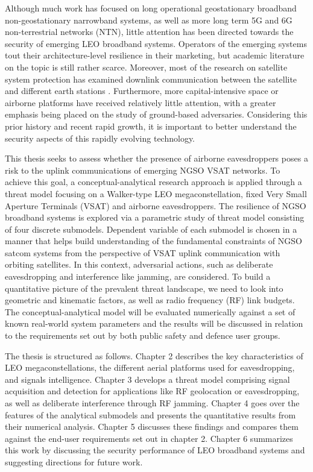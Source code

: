 \documentclass[english, 12pt, a4paper, elec, utf8, a-1b, online]{aaltothesis}
\begin{document}
Although much work has focused on long operational geostationary broadband non-geostationary narrowband systems, as well as more long term 5G and 6G non-terrestrial networks (NTN), little attention has been directed towards the security of emerging LEO broadband systems.
Operators of the emerging systems tout their architecture-level resilience in their marketing, but academic literature on the topic is still rather scarce.
Moreover, most of the research on satellite system protection has examined downlink communication between the satellite and different earth stations \cite{abdelsalam2023physical}.
Furthermore, more capital-intensive space or airborne platforms have received relatively little attention, with a greater emphasis being placed on the study of ground-based adversaries.
Considering this prior history and recent rapid growth, it is important to better understand the security aspects of this rapidly evolving technology. 

This thesis seeks to assess whether the presence of airborne eavesdroppers poses a risk to the uplink communications of emerging NGSO VSAT networks. %
To achieve this goal, a conceptual-analytical research approach is applied through a threat model focusing on a Walker-type LEO megaconstellation, fixed Very Small Aperture Terminals (VSAT) and airborne eavesdroppers.
The resilience of NGSO broadband systems is explored via a parametric study of threat model consisting of four discrete submodels.
Dependent variable of each submodel is chosen in a manner that helps build understanding of the fundamental constraints of NGSO satcom systems from the perspective of VSAT uplink communication with orbiting satellites.
In this context, adversarial actions, such as deliberate eavesdropping and interference like jamming, are considered.
To build a quantitative picture of the prevalent threat landscape, we need to look into geometric and kinematic factors, as well as radio frequency (RF) link budgets. 
The conceptual-analytical model will be evaluated numerically against a set of known real-world system parameters and the results will be discussed in relation to the requirements set out by both public safety and defence user groups.

The thesis is structured as follows.
Chapter 2 describes the key characteristics of LEO megaconstellations, the different aerial platforms used for eavesdropping, and signals intelligence.
Chapter 3 develops a threat model comprising signal acquisition and detection for applications like RF geolocation or eavesdropping, as well as deliberate interference through RF jamming.
Chapter 4 goes over the features of the analytical submodels and presents the quantitative results from their numerical analysis.
Chapter 5 discusses these findings and compares them against the end-user requirements set out in chapter 2.
Chapter 6 summarizes this work by discussing the security performance of LEO broadband systems and suggesting directions for future work.
\end{document}
